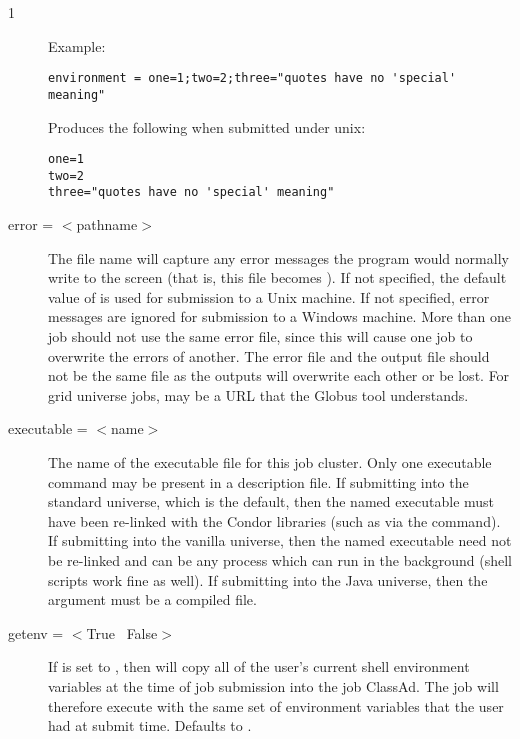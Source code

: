 \begin{ManPage}{\label{man-condor-submit}}{1}
\begin{description}
Example:

\begin{verbatim}
environment = one=1;two=2;three="quotes have no 'special' meaning"
\end{verbatim}

Produces the following when submitted under unix:

\begin{verbatim}
one=1
two=2
three="quotes have no 'special' meaning"
\end{verbatim}




\item[error = $<$pathname$>$]
The  file name will capture any
error messages the program would normally write to the screen
(that is, this file becomes ).
If not specified, the default value of
 is used for submission to a Unix machine.
If not specified, error messages are ignored
for submission to a Windows machine.
More than one job should not use the same error file, since
this will cause one job to overwrite the errors of another.
The error file and the output file should not be the same file
as the outputs will overwrite each other or be lost.
For grid universe jobs,  may be a URL that the Globus
tool  understands.



\item[executable = $<$name$>$]
The name of the executable file for this
job cluster. Only one executable command may be present in a description
file. If submitting into the standard universe, which is the default,
then the named executable must have been re-linked with the Condor
libraries (such as via the  command). If submitting into
the vanilla universe, then the named executable need not be re-linked and
can be any process which can run in the background (shell scripts work
fine as well).  If submitting into the Java universe, then the argument
must be a compiled  file.


\item[getenv = $<$True \Bar\ False$>$] If  is set to
, then  will copy all of the user's current
shell environment variables at the time of job submission into the job
ClassAd. The job will therefore execute with the same set of environment
variables that the user had at submit time. Defaults to .



\end{description}
\end{ManPage}
